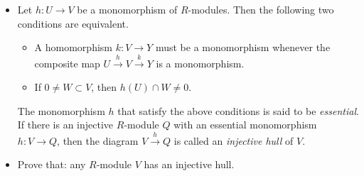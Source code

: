\documentclass[12pt, a4paper]{article}
\theoremstyle{remark}
\begin{document}
\begin{itemize}
    \item[(i)] Let $h : U \to V$ be a monomorphism of $R$-modules. Then the following two conditions are equivalent.
    \begin{itemize}
        \item[(a)] A homomorphism $k : V \to Y$ must be a monomorphism whenever the composite map $U \xrightarrow{h} V \xrightarrow{k} Y$ is a monomorphism.
        \item[(b)] If $0 \neq W \subset V$, then $h(U) \cap W \neq 0$.
    \end{itemize}
    The monomorphism $h$ that satisfy the above conditions is said to be \textit{essential}. If there is an injective $R$-module $Q$ with an essential monomorphism $h : V \to Q$, then the diagram $V \xrightarrow{h} Q$ is called an \textit{injective hull} of $V$.

    \item[(ii)] Prove that: any $R$-module $V$ has an injective hull.
\end{itemize}
\end{document}
